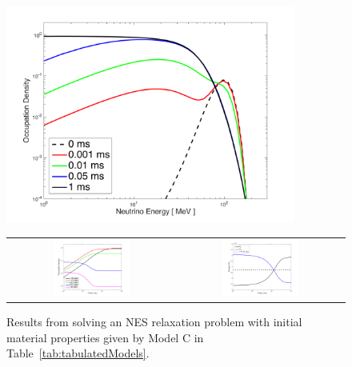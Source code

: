 \documentclass[10pt,preprint]{aastex}
\begin{document}
\begin{figure}
  \begin{center}
    \includegraphics[width=0.85\textwidth]{./Figures/RelaxationNES_Spectra.png}
    \begin{tabular}{cc}
      \includegraphics[width=0.475\textwidth]{./Figures/RelaxationNES_DensitiesVsTime.png} &
      \includegraphics[width=0.475\textwidth]{./Figures/RelaxationNES_EnergiesVsTime.png}
    \end{tabular}
  \end{center}
  \caption{Results from solving an NES relaxation problem with initial material properties given by Model C in Table~\ref{tab:tabulatedModels}.}
  \label{fig:RelaxationNES}
\end{figure}
\end{document}

